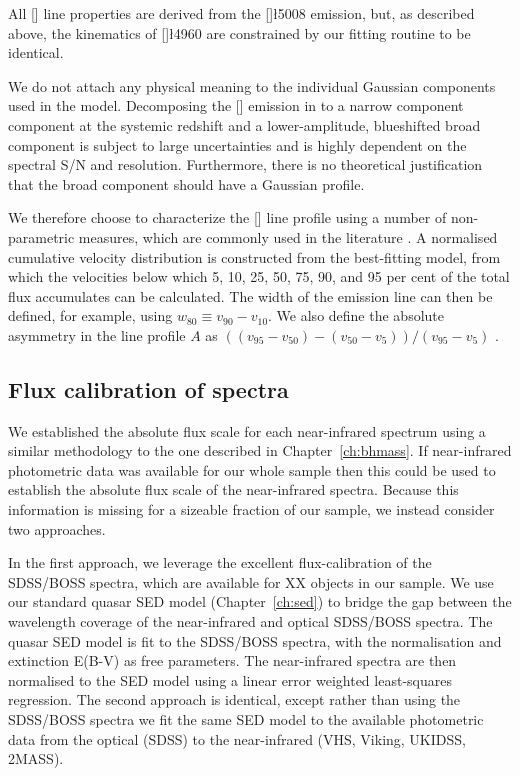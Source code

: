 All [] line properties are derived from the []\l5008 emission, but, as described above, the kinematics of []\l4960 are constrained by our fitting routine to be identical.

We do not attach any physical meaning to the individual Gaussian components used in the model. 
Decomposing the [] emission in to a narrow component component at the systemic redshift and a lower-amplitude, blueshifted broad component is subject to large uncertainties and is highly dependent on the spectral \ac{S/N} and resolution. 
Furthermore, there is no theoretical justification that the broad component should have a Gaussian profile.  

We therefore choose to characterize the [] line profile using a number of non-parametric measures, which are commonly used in the literature \citep[e.g.][]{zakamska14,zakamska16}. 
A normalised cumulative velocity distribution is constructed from the best-fitting model, from which the velocities below which 5, 10, 25, 50, 75, 90, and 95 per cent of the total flux accumulates can be calculated. 
The width of the emission line can then be defined, for example, using $w_{80} \equiv v_{90} - v_{10}$. 
We also define the absolute asymmetry in the line profile $A$ as $((v_{95} - v_{50}) - (v_{50} - v_{5})) / (v_{95} - v_{5})$ \citep[e.g.][]{zakamska14}. 

\subsection{Flux calibration of spectra}

We established the absolute flux scale for each near-infrared spectrum using a similar methodology to the one described in Chapter~\ref{ch:bhmass}. 
If near-infrared photometric data was available for our whole sample then this could be used to establish the absolute flux scale of the near-infrared spectra. 
Because this information is missing for a sizeable fraction of our sample, we instead consider two approaches. 

In the first approach, we leverage the excellent flux-calibration of the \ac{SDSS}/\ac{BOSS} spectra, which are available for XX objects in our sample. 
We use our standard quasar \ac{SED} model (Chapter~\ref{ch:sed}) to bridge the gap between the wavelength coverage of the near-infrared and optical \ac{SDSS}/\ac{BOSS} spectra.
The quasar \ac{SED} model is fit to the \ac{SDSS}/\ac{BOSS} spectra, with the normalisation and extinction E(B-V) as free parameters. 
The near-infrared spectra are then normalised to the \ac{SED} model using a linear error weighted least-squares regression.  
The second approach is identical, except rather than using the \ac{SDSS}/\ac{BOSS} spectra we fit the same \ac{SED} model to the available photometric data from the optical (\ac{SDSS}) to the near-infrared (VHS, Viking, UKIDSS, 2MASS). 

